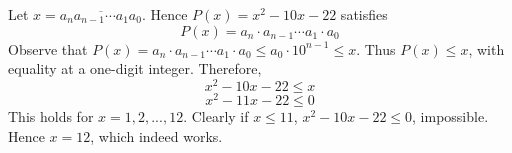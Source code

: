 Let $x=\overline{a_na_{n-1}\cdots a_1a_0}$. Hence $P(x)=x^2-10x-22$ satisfies
$$P(x)=a_n\cdot a_{n-1}\cdots a_1\cdot a_0$$
Observe that $P(x)=a_n\cdot a_{n-1}\cdots a_1\cdot a_0\le a_0\cdot 10^{n-1}\le x$.
Thus $P(x)\le x$, with equality at a one-digit integer.
Therefore,
$$x^2-10x-22\le x$$
$$x^2-11x-22\le 0$$
This holds for $x=1,2,...,12$. Clearly if $x\le 11$, $x^2-10x-22\le 0$, impossible.
Hence $x=12$, which indeed works. 
